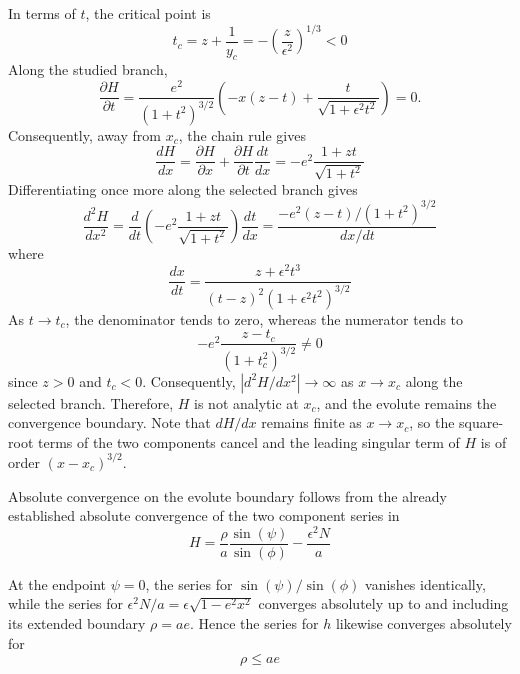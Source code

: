 \documentclass[a4paper]{amsart}
\begin{document}
In terms of $t$, the critical point is
\begin{equation*}
t_c=z+\frac1{y_c}
=-\left(\frac{z}{\epsilon^2}\right)^{1/3}<0
\end{equation*}
%
Along the studied branch,
\begin{equation*}
\frac{\partial H}{\partial t}
=
\frac{e^2}{(1+t^2)^{3/2}}
\left(
-x(z-t)+\frac{t}{\sqrt{1+\epsilon^2t^2}}
\right)=0.
\end{equation*}
Consequently, away from $x_c$, the chain rule gives
\begin{equation*}
\frac{dH}{dx}=\frac{\partial H}{\partial x}+\frac{\partial H}{\partial t}\frac{dt}{dx}=-e^2\frac{1+zt}{\sqrt{1+t^2}}
\end{equation*}
Differentiating once more along the selected branch gives
\begin{equation*}
\frac{d^2H}{dx^2}
=
\frac{d}{dt}
\left(-e^2\frac{1+zt}{\sqrt{1+t^2}}\right)
\frac{dt}{dx}
=
\frac{-e^2(z-t)/(1+t^2)^{3/2}}{dx/dt}
\end{equation*}
where
\begin{equation*}
\frac{dx}{dt}
=
\frac{z+\epsilon^2t^3}{(t-z)^2(1+\epsilon^2t^2)^{3/2}}
\end{equation*}
As $t\to t_c$, the denominator tends to zero, whereas the numerator tends to
\begin{equation*}
-e^2\frac{z-t_c}{(1+t_c^2)^{3/2}}\neq0
\end{equation*}
since $z>0$ and $t_c<0$. Consequently, $\left|d^2H/dx^2\right|\to\infty$
as $x\to x_c$ along the selected branch. Therefore, $H$ is not analytic at $x_c$, and the evolute remains the convergence boundary.
%
Note that $dH/dx$ remains finite as $x\to x_c$, so the square-root terms of the two components cancel and the leading singular term of $H$ is of order $(x-x_c)^{3/2}$.

Absolute convergence on the evolute boundary follows from the already established absolute convergence of the two component series in
\begin{equation*}
H=\frac{\rho}{a}\frac{\sin(\psi)}{\sin(\phi)}-\frac{\epsilon^2N}{a}
\end{equation*}

At the endpoint $\psi=0$, the series for $\sin(\psi)/\sin(\phi)$ vanishes identically, while the series for $\epsilon^2N/a=\epsilon\sqrt{1-e^2x^2}$ converges absolutely up to and including its extended boundary $\rho=ae$. Hence the series for $h$ likewise converges absolutely for
\begin{equation*}
\rho\leq ae
\end{equation*}
\end{document}
